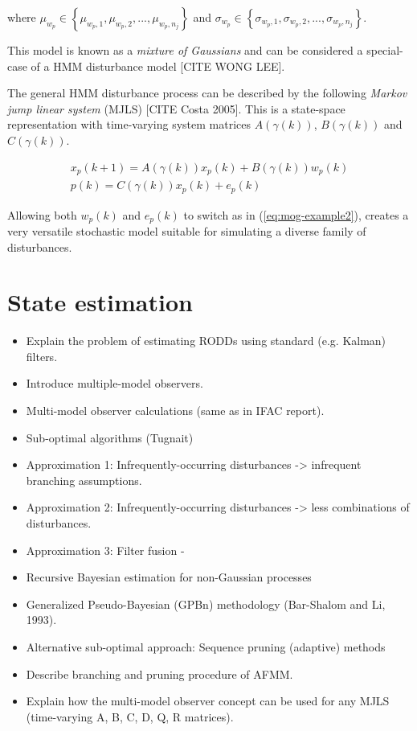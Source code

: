 where $\mu_{w_p}\in\left\{\mu_{w_p,1},\mu_{w_p,2},...,\mu_{w_p,n_j}\right\}$ and $\sigma_{w_p}\in\left\{\sigma_{w_p,1},\sigma_{w_p,2},...,\sigma_{w_p,n_j}\right\}$.

This model is known as a \textit{mixture of Gaussians} and can be considered a special-case of a HMM disturbance model [CITE WONG LEE].

The general HMM disturbance process can be described by the following \textit{Markov jump linear system} (MJLS) [CITE Costa 2005]. This is a state-space representation with time-varying system matrices $A(\gamma(k))$, $B(\gamma(k))$ and $C(\gamma(k))$.

\begin{equation} \label{eq:HMM}
	\begin{split}
	x_p(k+1)= A(\gamma(k))x_p(k)+B(\gamma(k))w_p(k) \\
	p(k)=C(\gamma(k))x_p(k) + e_p(k)
	\end{split}
\end{equation}

Allowing both $w_p(k)$ and $e_p(k)$ to switch as in (\ref{eq:mog-example2}), creates a very versatile stochastic model suitable for simulating a diverse family of disturbances.


\section{State estimation}

\begin{itemize}
	\item Explain the problem of estimating RODDs using standard (e.g. Kalman) filters.
	\item Introduce multiple-model observers.
	\item Multi-model observer calculations (same as in IFAC report).
	\item Sub-optimal algorithms (Tugnait)
	\item Approximation 1: Infrequently-occurring disturbances -> infrequent branching assumptions.
	\item Approximation 2: Infrequently-occurring disturbances -> less combinations of disturbances.
	\item Approximation 3: Filter fusion - 
	\item Recursive Bayesian estimation for non-Gaussian processes
	\item Generalized Pseudo-Bayesian (GPBn) methodology (Bar-Shalom and Li, 1993).
	\item Alternative sub-optimal approach: Sequence pruning (adaptive) methods 
	\item Describe branching and pruning procedure of AFMM.
	\item Explain how the multi-model observer concept can be used for any MJLS (time-varying A, B, C, D, Q, R matrices).
\end{itemize}

